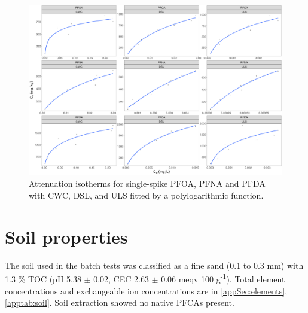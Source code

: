 \begin{figure}
    \centering
    \includegraphics[width=\textwidth]{R/figs/BC_single_attenuation.pdf}
    \caption{Attenuation isotherms for single-spike PFOA, PFNA and PFDA with CWC, DSL, and ULS fitted by a polylogarithmic function.}
    \label{fig:nonlinear_OND} 
\end{figure}



\section{Soil properties}\label{sec:Soil}
The soil used in the batch tests was classified as a fine sand (0.1 to 0.3 mm) with 1.3 \% TOC (pH 5.38 $\pm$ 0.02, CEC 2.63 $\pm$ 0.06 meqv 100 g\textsuperscript{-1}). Total element concentrations and exchangeable ion concentrations are in \cref{appSec:elements}, \cref{apptab:soil}. Soil extraction showed no native PFCAs present. 

